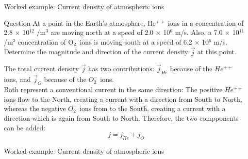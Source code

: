 
%
%

{
\problemslide

\begin{frame}{Worked example: Current density of atmospheric ions}

  \begin{blockexmplque}{Question}
    At a point in the Earth’s atmosphere, He$^{++}$ ions in
    a concentration of 2.8 $\times$ 10$^{12}$ /m$^3$ are
    moving north at a speed of 2.0 $\times$ 10$^6$ m/s.
    Also, a 7.0 $\times$ 10$^{11}$ /m$^3$ concentration of
    O$_{2}^{-}$ ions is moving south at a speed of 6.2 $\times$ 10$^6$ m/s.
    Determine the magnitude and direction of the
    current density $\vec{j}$ at this point.
  \end{blockexmplque}

  The total current density $\vec{j}$ has two contributions:
  $\vec{j}_{He}$ because of the $He^{++}$ ions, and
  $\vec{j}_{O}$ because of the $O_2^{-}$ ions.\\

  Both represent a conventional current in the same direction:
  The positive $He^{++}$ ions flow to the North, creating a current with a direction
  from South to North, whereas the negative $O_2^{-}$ ions from to the South,
  creating a current with a direction which is again from South to North.
  Therefore, the two compponents can be added:
  \begin{equation*}
    j = j_{He} + j_{O}
  \end{equation*}

\end{frame}

%
%
%

\begin{frame}{Worked example: Current density of atmospheric ions}


\end{frame}}
